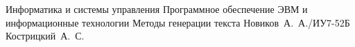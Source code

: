 \documentclass{bmstu}
\begin{document}
\makeresearchtitle
    {Информатика и системы управления}
    {Программное обеспечение ЭВМ и информационные технологии}
    {Методы генерации текста}
    {Новиков~А.~А./ИУ7-52Б}
    {Кострицкий~А.~С.}
    {}
    {}
    



\maketableofcontents





\makebibliography


\end{document}
